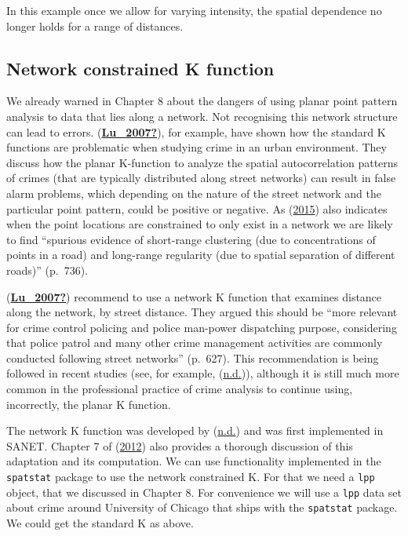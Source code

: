 \documentclass[
  krantz2]{krantz}
\begin{document}
In this example once we allow for varying intensity, the spatial dependence no longer holds for a range of distances.

\hypertarget{network-constrained-k-function}{%
\subsection{Network constrained K function}\label{network-constrained-k-function}}

We already warned in Chapter 8 about the dangers of using planar point pattern analysis to data that lies along a network. Not recognising this network structure can lead to errors. (\protect\hyperlink{ref-Lu_2007}{\textbf{Lu\_2007?}}), for example, have shown how the standard K functions are problematic when studying crime in an urban environment. They discuss how the planar K-function to analyze the spatial autocorrelation patterns of crimes (that are typically distributed along street networks) can result in false alarm problems, which depending on the nature of the street network and the particular point pattern, could be positive or negative. As (\protect\hyperlink{ref-Baddeley_2016}{2015}) also indicates when the point locations are constrained to only exist in a network we are likely to find ``spurious evidence of short-range clustering (due to concentrations of points in a road) and long-range regularity (due to spatial separation of different roads)'' (p.~736).

(\protect\hyperlink{ref-Lu_2007}{\textbf{Lu\_2007?}}) recommend to use a network K function that examines distance along the network, by street distance. They argued this should be ``more relevant for crime control policing and police man-power dispatching purpose, considering that police patrol and many other crime management activities are commonly conducted following street networks'' (p.~627). This recommendation is being followed in recent studies (see, for example, (\protect\hyperlink{ref-Khalid_2018}{n.d.})), although it is still much more common in the professional practice of crime analysis to continue using, incorrectly, the planar K function.

The network K function was developed by (\protect\hyperlink{ref-Okabe_2001}{n.d.}) and was first implemented in SANET. Chapter 7 of (\protect\hyperlink{ref-Okabe_2012}{2012}) also provides a thorough discussion of this adaptation and its computation. We can use functionality implemented in the \texttt{spatstat} package to use the network constrained K. For that we need a \texttt{lpp} object, that we discussed in Chapter 8. For convenience we will use a \texttt{lpp} data set about crime around University of Chicago that ships with the \texttt{spatstat} package. We could get the standard K as above.
\end{document}
